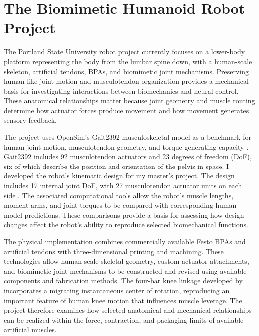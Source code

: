 \section{The Biomimetic Humanoid Robot Project}\label{sec:project}

The Portland State University robot project currently focuses on a lower-body platform representing the body from the lumbar spine down, with a human-scale skeleton, artificial tendons, BPAs, and biomimetic joint mechanisms. Preserving human-like joint motion and musculotendon organization provides a mechanical basis for investigating interactions between biomechanics and neural control. These anatomical relationships matter because joint geometry and muscle routing determine how actuator forces produce movement and how movement generates sensory feedback.

The project uses OpenSim's Gait2392 musculoskeletal model as a benchmark for human joint motion, musculotendon geometry, and torque-generating capacity \citep{delp_opensim_2007, bolen_bipedal_2019}. Gait2392 includes 92 musculotendon actuators and 23 degrees of freedom (DoF), six of which describe the position and orientation of the pelvis in space. I developed the robot's kinematic design for my master's project. The design includes 17 internal joint DoF, with 27 musculotendon actuator units on each side \citep{bolen_bipedal_2019, bolen_determination_2019}. The associated computational tools allow the robot's muscle lengths, moment arms, and joint torques to be compared with corresponding human-model predictions. These comparisons provide a basis for assessing how design changes affect the robot's ability to reproduce selected biomechanical functions.

The physical implementation combines commercially available Festo BPAs and artificial tendons with three-dimensional printing and machining. These technologies allow human-scale skeletal geometry, custom actuator attachments, and biomimetic joint mechanisms to be constructed and revised using available components and fabrication methods. The four-bar knee linkage developed by \citet{steele_development_2017, steele_biomimetic_2018, steele_biomimetic_2018-1} incorporates a migrating instantaneous center of rotation, reproducing an important feature of human knee motion that influences muscle leverage. The project therefore examines how selected anatomical and mechanical relationships can be realized within the force, contraction, and packaging limits of available artificial muscles.

